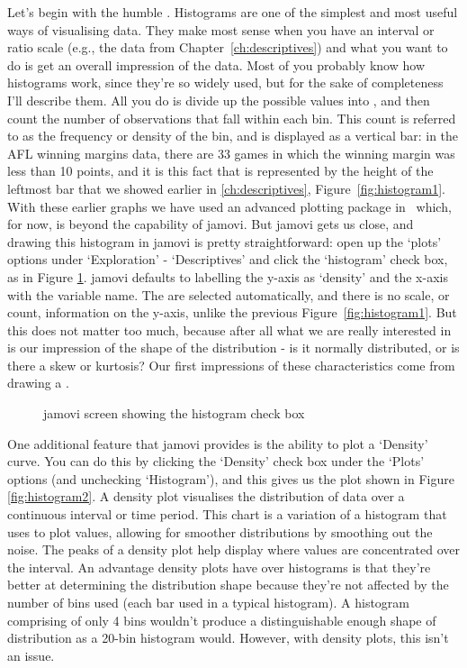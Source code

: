 Let's begin with the humble . Histograms are one of the simplest and most useful ways of visualising data. They make most sense when you have an interval or ratio scale (e.g., the  data from Chapter~\ref{ch:descriptives}) and what you want to do is get an overall impression of the data. Most of you probably know how histograms work, since they're so widely used, but for the sake of completeness I'll describe them. All you do is divide up the possible values into , and then count the number of observations that fall within each bin. This count is referred to as the frequency or density of the bin, and is displayed as a vertical bar: in the AFL winning margins data, there are 33 games in which the winning margin was less than 10 points, and it is this fact that is represented by the height of the leftmost bar that we showed earlier in \ref{ch:descriptives}, Figure~\ref{fig:histogram1}. With these earlier graphs we have used an advanced plotting package in \R\ which, for now, is beyond the capability of jamovi. But jamovi gets us close, and drawing this histogram in jamovi is pretty straightforward: open up the `plots' options under `Exploration' - `Descriptives' and click the `histogram' check box, as in Figure \ref{fig:jamovi_histogram}. jamovi defaults to labelling the y-axis as `density' and the x-axis with the variable name. The  are selected automatically, and there is no scale, or count, information on the y-axis, unlike the previous Figure~\ref{fig:histogram1}. But this does not matter too much, because after all what we are really interested in is our impression of the shape of the distribution - is it normally distributed, or is there a skew or kurtosis? Our first impressions of these characteristics come from drawing a .

\begin{figure}[h]
\begin{center}
\caption{jamovi screen showing the histogram check box}
\label{fig:jamovi_histogram}
\HR
\end{center}
\end{figure}

One additional feature that jamovi provides is the ability to plot a `Density' curve. You can do this by clicking the `Density' check box under the `Plots' options (and unchecking `Histogram'), and this gives us the plot shown in Figure \ref{fig:histogram2}. A density plot visualises the distribution of data over a continuous interval or time period. This chart is a variation of a histogram that uses  to plot values, allowing for smoother distributions by smoothing out the noise. The peaks of a density plot help display where values are concentrated over the interval. An advantage density plots have over histograms is that they're better at determining the distribution shape because they're not affected by the number of bins used (each bar used in a typical histogram). A histogram comprising of only 4 bins wouldn't produce a distinguishable enough shape of distribution as a 20-bin histogram would. However, with density plots, this isn't an issue. 

